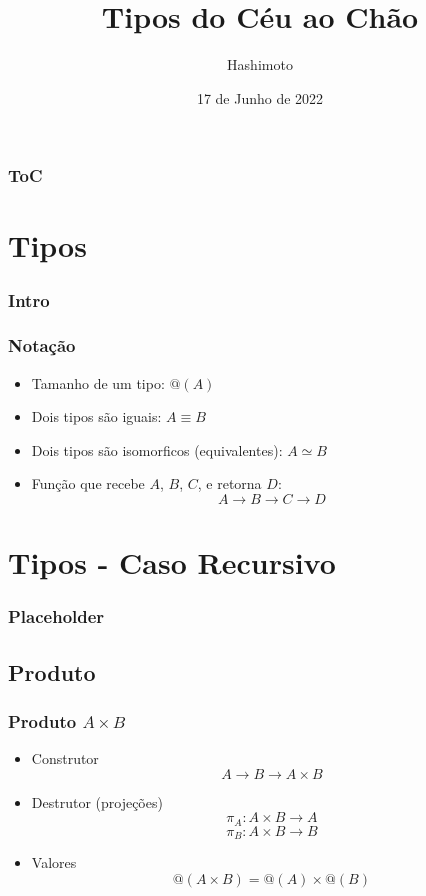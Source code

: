 \documentclass{beamer}
\title{Tipos do Céu ao Chão}
\author{Hashimoto}
\date{17 de Junho de 2022}
\makeatletter
\newcommand{\typetam}{@}
\newcommand{\typeeq}{\equiv}
\newcommand{\typesim}{\simeq}
\makeatother
\begin{document}
\begin{frame}
    \titlepage
\end{frame}

\begin{frame}
    \frametitle{ToC}
    \tableofcontents[hideallsubsections]
\end{frame}

\section{Tipos}
\begin{frame}
    \frametitle{Intro}
\end{frame}

\begin{frame}
    \frametitle{Notação}
    \begin{itemize}
        \item Tamanho de um tipo: \(\typetam(A)\)
        \item Dois tipos são iguais: \( A \typeeq B \)
        \item Dois tipos são isomorficos (equivalentes):
            \( A \typesim B \)
        \item Função que recebe \(A\), \(B\), \(C\),
            e retorna \(D\): \[ A \to B \to C \to D \]
    \end{itemize}
\end{frame}

\section{Tipos - Caso Recursivo}
\begin{frame}
    \frametitle{Placeholder}
\end{frame}

\subsection{Produto}
\begin{frame}
    \frametitle{Produto \(A \times B\)}
    \begin{itemize}
        \item Construtor
            \[
                A \to B \to A \times B
            \]
        \item Destrutor (projeções)
            \[
                \pi_A : A \times B \to A
            \] \[
                \pi_B : A \times B \to B
            \]
        \item Valores
            \[
                \typetam(A \times B) = \typetam(A) \times \typetam(B)
            \]
    \end{itemize}
\end{frame}
\end{document}
